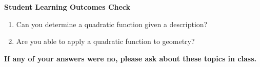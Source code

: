 \documentclass[11pt]{article}
\begin{document}
\noindent \textbf{Student Learning Outcomes Check}

\begin{enumerate}
\item Can you determine a quadratic function given a description?
\item Are you able to apply a quadratic function to geometry?

\end{enumerate}

\noindent \textbf{If any of your answers were no, please ask about these topics in class.}
\end{document}
